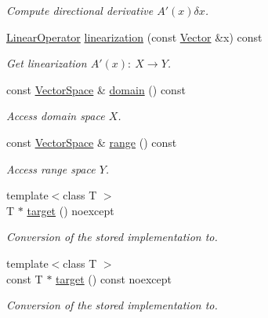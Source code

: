 \begin{DoxyCompactItemize}
\begin{DoxyCompactList}\small\item\em \-Compute directional derivative $A'(x)\delta x$. \end{DoxyCompactList}\item 
\hypertarget{classSpacy_1_1C1Operator_a71aabe09ec29a8a1bb197eef035d6672}{\hyperlink{classSpacy_1_1LinearOperator}{\-Linear\-Operator} \hyperlink{classSpacy_1_1C1Operator_a71aabe09ec29a8a1bb197eef035d6672}{linearization} (const \hyperlink{classSpacy_1_1Vector}{\-Vector} \&x) const }\label{classSpacy_1_1C1Operator_a71aabe09ec29a8a1bb197eef035d6672}

\begin{DoxyCompactList}\small\item\em \-Get linearization $A'(x):\ X\to Y $. \end{DoxyCompactList}\item 
\hypertarget{classSpacy_1_1C1Operator_aee0ffd5cee0b8a8df2f0b67b5aaf0ddb}{const \hyperlink{classSpacy_1_1VectorSpace}{\-Vector\-Space} \& \hyperlink{classSpacy_1_1C1Operator_aee0ffd5cee0b8a8df2f0b67b5aaf0ddb}{domain} () const }\label{classSpacy_1_1C1Operator_aee0ffd5cee0b8a8df2f0b67b5aaf0ddb}

\begin{DoxyCompactList}\small\item\em \-Access domain space $X$. \end{DoxyCompactList}\item 
\hypertarget{classSpacy_1_1C1Operator_a7df27427591907b13776e7ba3707bf05}{const \hyperlink{classSpacy_1_1VectorSpace}{\-Vector\-Space} \& \hyperlink{classSpacy_1_1C1Operator_a7df27427591907b13776e7ba3707bf05}{range} () const }\label{classSpacy_1_1C1Operator_a7df27427591907b13776e7ba3707bf05}

\begin{DoxyCompactList}\small\item\em \-Access range space $Y$. \end{DoxyCompactList}\item 
{\footnotesize template$<$class T $>$ }\\\-T $\ast$ \hyperlink{classSpacy_1_1C1Operator_a7c515af344029cf8e60e89d45bf8fade}{target} () noexcept
\begin{DoxyCompactList}\small\item\em \-Conversion of the stored implementation to. \end{DoxyCompactList}\item 
{\footnotesize template$<$class T $>$ }\\const \-T $\ast$ \hyperlink{classSpacy_1_1C1Operator_ab8a5618949b1b861e3085aa085922884}{target} () const noexcept
\begin{DoxyCompactList}\small\item\em \-Conversion of the stored implementation to. \end{DoxyCompactList}\end{DoxyCompactItemize}


